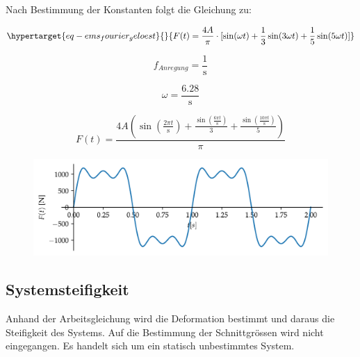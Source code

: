 \documentclass[
  letterpaper,
  DIV=11]{scrreprt}
\begin{document}
Nach Bestimmung der Konstanten folgt die Gleichung zu:

\begin{equation}\protect\hypertarget{eq-ems_fourier_geloest}{}{
F(t) = \frac{4A}{\pi} \cdot [\sin(\omega t) + \frac{1}{3}\sin(3\omega t) + \frac{1}{5}\sin(5 \omega t)]
}\label{eq-ems_fourier_geloest}\end{equation}

\begin{equation}f_{Anregung} = \frac{1}{\text{s}}\end{equation}

\begin{equation}\omega = \frac{6.28}{\text{s}}\end{equation}

\begin{equation}F{\left(t \right)} = \frac{4 A \left(\sin{\left(\frac{2 \pi t}{\text{s}} \right)} + \frac{\sin{\left(\frac{6 \pi t}{\text{s}} \right)}}{3} + \frac{\sin{\left(\frac{10 \pi t}{\text{s}} \right)}}{5}\right)}{\pi}\end{equation}

\begin{figure}[H]

{\centering \includegraphics{index_files/mediabag/ems_06_files/figure-pdf/cell-8-output-1.pdf}

}

\end{figure}

\hypertarget{systemsteifigkeit-2}{%
\subsection{Systemsteifigkeit}\label{systemsteifigkeit-2}}

Anhand der Arbeitsgleichung wird die Deformation bestimmt und daraus die
Steifigkeit des Systems. Auf die Bestimmung der Schnittgrössen wird
nicht eingegangen. Es handelt sich um ein statisch unbestimmtes System.
\end{document}
